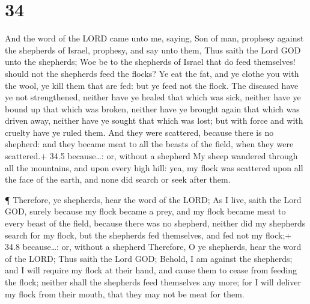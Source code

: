\hypertarget{section-33}{%
\section{34}\label{section-33}}

 And the word of the LORD came unto me, saying, 
Son of man, prophesy against the shepherds of Israel, prophesy, and say
unto them, Thus saith the Lord GOD unto the shepherds; Woe be to the
shepherds of Israel that do feed themselves! should not the shepherds
feed the flocks?  Ye eat the fat, and ye clothe you with the
wool, ye kill them that are fed: but ye feed not the flock. 
The diseased have ye not strengthened, neither have ye healed that which
was sick, neither have ye bound up that which was broken, neither have
ye brought again that which was driven away, neither have ye sought that
which was lost; but with force and with cruelty have ye ruled them.
 And they were scattered, because there is no shepherd: and
they became meat to all the beasts of the field, when they were
scattered.+ 34.5 because\ldots: or, without a shepherd  My
sheep wandered through all the mountains, and upon every high hill: yea,
my flock was scattered upon all the face of the earth, and none did
search or seek after them.

 ¶ Therefore, ye shepherds, hear the word of the LORD;
 As I live, saith the Lord GOD, surely because my flock
became a prey, and my flock became meat to every beast of the field,
because there was no shepherd, neither did my shepherds search for my
flock, but the shepherds fed themselves, and fed not my flock;+ 34.8
because\ldots: or, without a shepherd  Therefore, O ye
shepherds, hear the word of the LORD;  Thus saith the Lord
GOD; Behold, I am against the shepherds; and I will require my flock at
their hand, and cause them to cease from feeding the flock; neither
shall the shepherds feed themselves any more; for I will deliver my
flock from their mouth, that they may not be meat for them.

